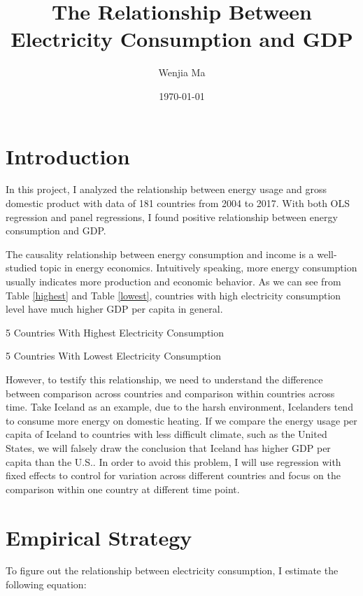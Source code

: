\documentclass[11pt,letterpaper]{article}
\title{The Relationship Between Electricity Consumption and GDP}
\author{Wenjia Ma}
\affil{Harris School of Public Policy}
\date{\today}
\begin{document}
	\maketitle
	
	\section{Introduction}
	In this project, I analyzed the relationship between energy usage and gross domestic product with data of 181 countries from 2004 to 2017. With both OLS regression and panel regressions, I found positive relationship between energy consumption and GDP.
	
	The causality relationship between energy consumption and income is a well-studied topic in energy economics. Intuitively speaking, more energy consumption usually indicates more production and economic behavior. As we can see from Table \ref{highest} and Table \ref{lowest}, countries with high electricity consumption level have much higher GDP per capita in general.
	
	\begin{table}
		\centering
		\caption{5 Countries With Highest Electricity Consumption}
		
		\label{highest}
	\end{table}
			
	\begin{table}
		\centering
		\caption{5 Countries With Lowest Electricity Consumption}
		
		\label{lowest}
	\end{table}
		
	However, to testify this relationship, we need to understand the difference between comparison across countries and comparison within countries across time. Take Iceland as an example, due to the harsh environment, Icelanders tend to consume more energy on domestic heating. If we compare the energy usage per capita of Iceland to countries with less difficult climate, such as the United States, we will falsely draw the conclusion that Iceland has higher GDP per capita than the U.S.. In order to avoid this problem, I will use regression with fixed effects to control for variation across different countries and focus on the comparison within one country at different time point.
	
	
	
	\section{Empirical Strategy}
	To figure out the relationship between electricity consumption, I estimate the following equation:
	
\end{document}
